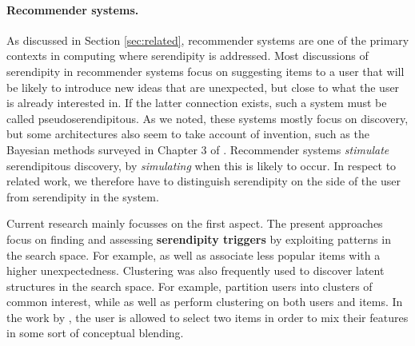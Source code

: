 \paragraph{Recommender systems.} 
As discussed in Section \ref{sec:related}, recommender systems are one
of the primary contexts in computing where serendipity is addressed. Most discussions of serendipity in recommender systems focus on suggesting items to a user that will be likely to introduce new ideas that are unexpected, but close to what the user is already interested in. If the latter connection exists, such a system must be called pseudoserendipitous. As we noted, these systems mostly focus on discovery, but some architectures also seem to take account of invention, such as the Bayesian methods surveyed in Chapter 3 of . Recommender systems \emph{stimulate} serendipitous discovery, by \emph{simulating} when this is likely to occur. In respect to related work, we therefore have to distinguish serendipity on the side of the user from serendipity in the system. 

Current research mainly focusses on the first aspect. The present approaches focus on finding and assessing \textbf{serendipity triggers} by exploiting patterns in the search space. For example, \cite{Herlocker2004} as well as \cite{Lu2012} associate less popular items with a higher unexpectedness. Clustering was also frequently used to discover latent structures in the search space. For example, \cite{Kamahara2005} partition users into clusters of common interest, while \cite{Onuma2009} as well as \cite{Zhang2011} perform clustering on both users and items. In the work by \cite{Oku2011}, the user is allowed to select two items in order to mix their features in some sort of conceptual blending.

